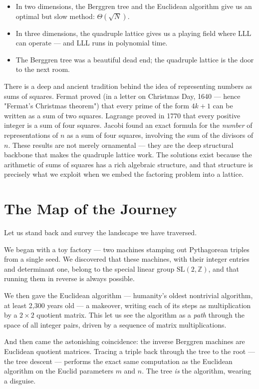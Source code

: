 \begin{itemize}
\item In two dimensions, the Berggren tree and the Euclidean algorithm give us an optimal but slow method: $\Theta(\sqrt{N})$.
\item In three dimensions, the quadruple lattice gives us a playing field where LLL can operate --- and LLL runs in polynomial time.
\item The Berggren tree was a beautiful dead end; the quadruple lattice is the door to the next room.
\end{itemize}
There is a deep and ancient tradition behind the idea of representing numbers as sums of squares. Fermat proved (in a letter on Christmas Day, 1640 --- hence "Fermat's Christmas theorem") that every prime of the form $4k + 1$ can be written as a sum of two squares. Lagrange proved in 1770 that every positive integer is a sum of four squares. Jacobi found an exact formula for the \textit{number} of representations of $n$ as a sum of four squares, involving the sum of the divisors of $n$. These results are not merely ornamental --- they are the deep structural backbone that makes the quadruple lattice work. The solutions exist because the arithmetic of sums of squares has a rich algebraic structure, and that structure is precisely what we exploit when we embed the factoring problem into a lattice.


\bigskip


\section{The Map of the Journey}

Let us stand back and survey the landscape we have traversed.

We began with a toy factory --- two machines stamping out Pythagorean triples from a single seed. We discovered that these machines, with their integer entries and determinant one, belong to the special linear group $\mathrm{SL}(2, \mathbb{Z})$, and that running them in reverse is always possible.

We then gave the Euclidean algorithm --- humanity's oldest nontrivial algorithm, at least 2,300 years old --- a makeover, writing each of its steps as multiplication by a $2 \times 2$ quotient matrix. This let us see the algorithm as a \textit{path} through the space of all integer pairs, driven by a sequence of matrix multiplications.

And then came the astonishing coincidence: the inverse Berggren machines are Euclidean quotient matrices. Tracing a triple back through the tree to the root --- the tree descent --- performs the exact same computation as the Euclidean algorithm on the Euclid parameters $m$ and $n$. The tree \textit{is} the algorithm, wearing a disguise.

